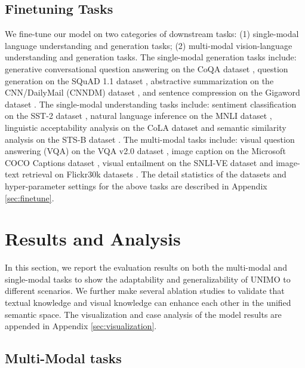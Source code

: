 \documentclass[11pt,a4paper]{article}
\begin{document}
\subsection{Finetuning Tasks}
\label{ssec:fin}

We fine-tune our model on two categories of downstream tasks: (1) single-modal language understanding and generation tasks; (2) multi-modal vision-language understanding and generation tasks. 
The single-modal generation tasks include: 
generative conversational question answering on the CoQA dataset \citep{reddy-etal-2019-coqa},
question generation on the SQuAD 1.1 dataset \citep{rajpurkar-etal-2016-squad},
abstractive summarization on the CNN/DailyMail (CNNDM) dataset \citep{hermann2015teaching}, 
and sentence compression on the Gigaword dataset \citep{rush-etal-2015-neural}.
The single-modal understanding tasks include: sentiment classification on the SST-2 dataset \citep{socher-etal-2013-recursive}, natural language inference on the MNLI dataset \citep{williams2017broad}, linguistic acceptability analysis on the CoLA dataset \citep{warstadt2019cola} and semantic similarity analysis on the STS-B dataset \citep{cer-etal-2017-semeval}.
The multi-modal tasks include: visual question answering (VQA) on the VQA v2.0 dataset \citep{goyal2017making}, image caption on the Microsoft COCO Captions dataset \citep{chen2015microsoft}, visual entailment on the SNLI-VE dataset \citep{xie2019visual} and image-text retrieval on Flickr30k datasets \citep{young-etal-2014-image}. The detail statistics of the datasets and hyper-parameter settings for the above tasks are described in Appendix \ref{sec:finetune}.



\section{Results and Analysis}
\label{sec:res}

In this section, we report the evaluation results on both the multi-modal and single-modal tasks to show the adaptability and generalizability of UNIMO to different scenarios.
We further make several ablation studies to validate that textual knowledge and visual knowledge can enhance each other in the unified semantic space.
The visualization and case analysis of the model results are  appended in Appendix \ref{sec:visualization}.


\subsection{Multi-Modal tasks}
\label{ssec:mlu}
\end{document}
